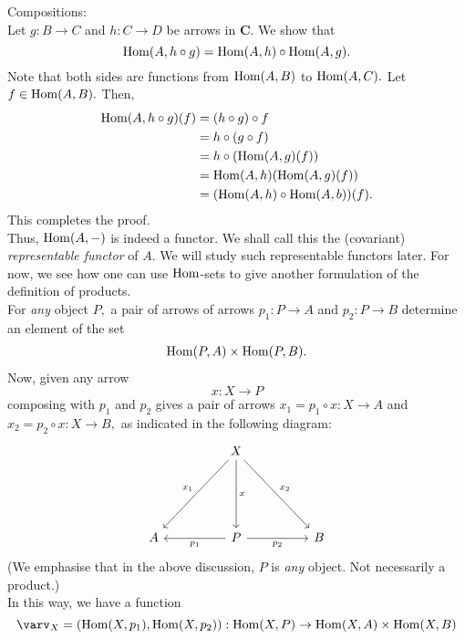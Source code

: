 Compositions:\\
Let $g:B\to C$ and $h:C\to D$ be arrows in $\mathbf{C}.$ We show that
\begin{equation*} 
	\operatorname{Hom}(A, h\circ g) = \operatorname{Hom}(A, h)\circ\operatorname{Hom}(A, g).
\end{equation*}
Note that both sides are functions from $\operatorname{Hom}(A, B)$ to $\operatorname{Hom}(A, C).$ Let $f \in \operatorname{Hom}(A, B).$ Then,
\begin{align*} 
	\operatorname{Hom}(A, h\circ g)(f) &= (h\circ g)\circ f\\
	&= h \circ (g \circ f)\\
	&= h \circ (\operatorname{Hom}(A, g)(f))\\
	&= \operatorname{Hom}(A, h)(\operatorname{Hom}(A, g)(f))\\
	&= (\operatorname{Hom}(A, h)\circ\operatorname{Hom}(A, b))(f).
\end{align*}
This completes the proof.\\
Thus, $\operatorname{Hom}(A, -)$ is indeed a functor. We shall call this the (covariant) \emph{representable functor} of $A.$ We will study such representable functors later. For now, we see how one can use $\operatorname{Hom}$-sets to give another formulation of the definition of products.\\
For \emph{any} object $P,$ a pair of arrows of arrows $p_1:P\to A$ and $p_2:P\to B$ determine an element of the set
\begin{align*} 
	\operatorname{Hom}(P, A) \times \operatorname{Hom}(P, B).
\end{align*}
Now, given any arrow
\begin{equation*} 
	x:X \to P
\end{equation*}
composing with $p_1$ and $p_2$ gives a pair of arrows $x_1 = p_1\circ x: X \to A$ and $x_2 = p_2 \circ x:X \to B,$ as indicated in the following diagram:
\begin{equation*} 
	\begin{tikzcd}
	&& X \arrow[llddd, "x_1"'] \arrow[ddd, "x"] \arrow[rrddd, "x_2"] &&\\
	&&&&\\&&&&\\
	A && P \arrow[ll, "p_1"] \arrow[rr, "p_2"'] && B
	\end{tikzcd}
\end{equation*}
(We emphasise that in the above discussion, $P$ is \emph{any} object. Not necessarily a product.)\\
In this way, we have a function
\begin{equation*} 
	\varv_X = (\Hom(X, p_1), \Hom(X, p_2)) : \Hom(X, P) \to \Hom(X, A) \times \Hom(X, B)
\end{equation*}
